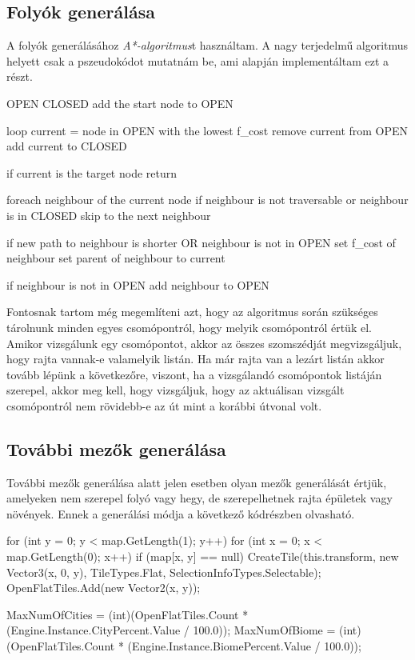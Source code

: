 \subsection{Folyók generálása}

A folyók generálásához \textit{A*-algoritmus}t használtam. A nagy terjedelmű algoritmus helyett csak a pszeudokódot mutatnám be, ami alapján implementáltam ezt a részt.
\begin{cpp}
OPEN 
CLOSED 
add the start node to OPEN

loop
   current = node in OPEN  with the lowest f_cost
   remove current from OPEN
   add current to CLOSED

   if current is the target node
      return

   foreach neighbour of the current node
      if neighbour is not traversable or neighbour is in CLOSED
         skip to the next neighbour

      if new path to neighbour is shorter OR neighbour is not in OPEN
         set f_cost of neighbour
         set parent of neighbour to current
         
         if neighbour is not in OPEN
            add neighbour to OPEN
\end{cpp}

Fontosnak tartom még megemlíteni azt, hogy az algoritmus során szükséges tárolnunk minden egyes csomópontról, hogy melyik csomópontról értük el. Amikor vizsgálunk egy csomópontot, akkor az összes szomszédját megvizsgáljuk, hogy rajta vannak-e valamelyik listán. Ha már rajta van a lezárt listán akkor tovább lépünk a következőre, viszont, ha a vizsgálandó csomópontok listáján szerepel, akkor meg kell, hogy vizsgáljuk, hogy az aktuálisan vizsgált csomópontról nem rövidebb-e az út mint a korábbi útvonal volt.

\subsection{További mezők generálása}

További mezők generálása alatt jelen esetben olyan mezők generálását értjük, amelyeken nem szerepel folyó vagy hegy, de szerepelhetnek rajta épületek vagy növények. Ennek a generálási módja a következő kódrészben olvasható.
\begin{cpp}
for (int y = 0; y < map.GetLength(1); y++)
{
   for (int x = 0; x < map.GetLength(0); x++)
   {
      if (map[x, y] == null)
      {
         CreateTile(this.transform, new Vector3(x, 0, y),
         TileTypes.Flat, SelectionInfoTypes.Selectable);
         OpenFlatTiles.Add(new Vector2(x, y));
      }
   }
}

MaxNumOfCities = (int)(OpenFlatTiles.Count * 
(Engine.Instance.CityPercent.Value / 100.0));
MaxNumOfBiome = (int)(OpenFlatTiles.Count * 
(Engine.Instance.BiomePercent.Value / 100.0));
\end{cpp}

